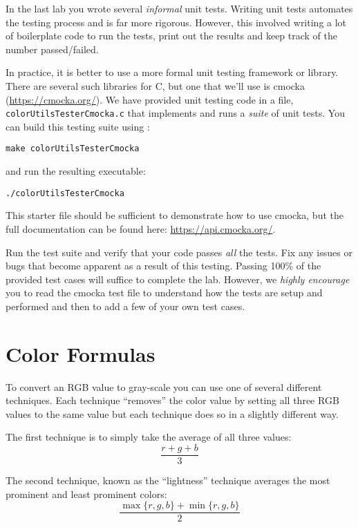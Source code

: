 \documentclass[12pt]{scrartcl}
\begin{document}
In the last lab you wrote several \emph{informal} unit tests.  
Writing unit tests automates the testing process and is far more
rigorous.  However, this involved writing a lot of boilerplate 
code to run the tests, print out the results and keep track 
of the number passed/failed.  

In practice, it is better to use a more formal unit testing framework
or library.  There are several such libraries for C, but one that 
we'll use is cmocka (\url{https://cmocka.org/}).  We have provided
unit testing code in a file, \texttt{colorUtilsTesterCmocka.c} 
that implements and runs a \emph{suite} of unit tests. You can 
build this testing suite using :

\texttt{make colorUtilsTesterCmocka}

and run the resulting executable:

\texttt{./colorUtilsTesterCmocka}

This starter file should be sufficient to demonstrate how to 
use cmocka, but the full documentation 
can be found here: \url{https://api.cmocka.org/}.  

Run the test suite and verify that your code passes \emph{all} 
the tests.  Fix any issues or bugs that become apparent as a 
result of this testing.  Passing 100\% of the provided test cases
will suffice to complete the lab.  However, we \emph{highly encourage}
you to read the cmocka test file to understand how the tests are setup
and performed and then to add a few of your own test cases.  

\section*{Color Formulas}

To convert an RGB value to gray-scale you can use one of several
different techniques.  Each technique ``removes'' the color value by
setting all three RGB values to the same value but each technique 
does so in a slightly different way.

The first technique is to simply take the average of all three values:
  $$\frac{r + g + b}{3}$$

The second technique, known as the ``lightness'' technique averages 
the most prominent and least prominent colors:
  $$\frac{\max\{r, g, b\} + \min\{r, g, b\}}{2}$$
\end{document}
